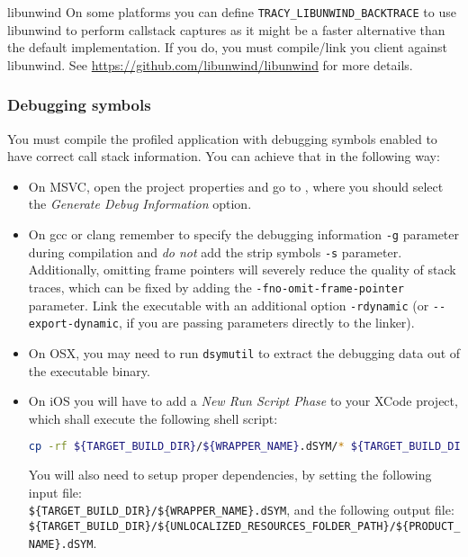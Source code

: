 \documentclass[hidelinks,titlepage,a4paper,twoside]{article}
\begin{document}
\begin{bclogo}[
noborder=true,
couleur=black!5,
logo=\bclampe
]{libunwind}
On some platforms you can define \texttt{TRACY\_LIBUNWIND\_BACKTRACE} to use libunwind to perform callstack captures as it might be a faster alternative than the default implementation. If you do, you must compile/link you client against libunwind. See \url{https://github.com/libunwind/libunwind} for more details.
\end{bclogo}

\subsubsection{Debugging symbols}

You must compile the profiled application with debugging symbols enabled to have correct call stack information. You can achieve that in the following way:

\begin{itemize}
\item On MSVC, open the project properties and go to , where you should select the \emph{Generate Debug Information} option.
\item On gcc or clang remember to specify the debugging information \texttt{-g} parameter during compilation and \emph{do not} add the strip symbols \texttt{-s} parameter. Additionally, omitting frame pointers will severely reduce the quality of stack traces, which can be fixed by adding the \texttt{-fno-omit-frame-pointer} parameter. Link the executable with an additional option \texttt{-rdynamic} (or \texttt{-{}-export-dynamic}, if you are passing parameters directly to the linker).
\item On OSX, you may need to run \texttt{dsymutil} to extract the debugging data out of the executable binary.
\item On iOS you will have to add a \emph{New Run Script Phase} to your XCode project, which shall execute the following shell script:

\begin{lstlisting}[language=sh]
cp -rf ${TARGET_BUILD_DIR}/${WRAPPER_NAME}.dSYM/* ${TARGET_BUILD_DIR}/${UNLOCALIZED_RESOURCES_FOLDER_PATH}/${PRODUCT_NAME}.dSYM
\end{lstlisting}

You will also need to setup proper dependencies, by setting the following input file:\\
\texttt{\$\{TARGET\_BUILD\_DIR\}/\$\{WRAPPER\_NAME\}.dSYM}, and the following output file:\\
\texttt{\$\{TARGET\_BUILD\_DIR\}/\$\{UNLOCALIZED\_RESOURCES\_FOLDER\_PATH\}/\$\{PRODUCT\_NAME\}.dSYM}.
\end{itemize}
\end{document}
